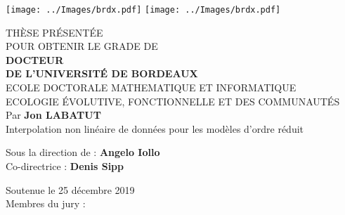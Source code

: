 


\pagestyle{empty}
\texttt{[image: ../Images/brdx.pdf]}
\hfill
\texttt{[image: ../Images/brdx.pdf]}
\hfill
\begin{center}
\doublespacing
\begin{Large}

THÈSE PRÉSENTÉE\\ POUR OBTENIR LE GRADE DE \\
{\LARGE \textbf{DOCTEUR\\DE L'UNIVERSITÉ DE BORDEAUX} } \\
\vspace{0.55cm}
ECOLE DOCTORALE MATHEMATIQUE ET INFORMATIQUE\\
{\normalsize ECOLOGIE ÉVOLUTIVE, FONCTIONNELLE ET DES COMMUNAUTÉS} \\
\vspace{0.55cm}
Par \textbf{Jon LABATUT} \\
\vspace{0.55cm}
{\Large Interpolation non linéaire de données pour les modèles d'ordre réduit}
\end{Large}
\vspace{0.55cm}
\begin{normalsize}
\begin{singlespace}
Sous la direction de : \textbf{Angelo Iollo}\\
Co-directrice : \textbf{Denis Sipp}
\end{singlespace}
\end{normalsize}
\end{center}
\vfill
{\large Soutenue le 25 décembre 2019 }\\
\vfill
Membres du jury :
\begin{table}[b]
\centering
{}
\end{table}

